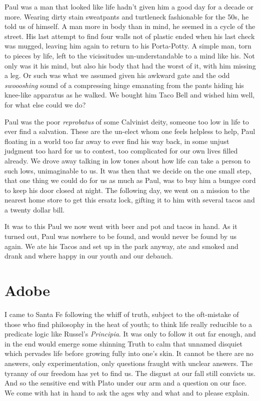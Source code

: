 \documentclass[ebook, 10pt, openright, onecolumn]{memoir}
\begin{document}
Paul was a man that looked like life hadn't given him a good day for a decade or
more.  Wearing dirty stain sweatpants and turtleneck fashionable for the 50s, he
told us of himself.  A man more in body than in mind, he seemed in a cycle of
the street.  His last attempt to find four walls not of plastic ended when his
last check was mugged, leaving him again to return to his Porta-Potty.  A simple
man, torn to pieces by life, left to the vicissitudes un-understandable to a
mind like his. Not only was it his mind, but also his body that had the worst of
it, with him missing a leg. Or such was what we assumed given his awkward gate
and the odd \textit{swoooshing} sound of a compressing hinge emanating from the
pants hiding his knee-like apparatus as he walked.  We bought him Taco Bell and
wished him well, for what else could we do?

Paul was the poor \textit{reprobatus} of some Calvinist deity, someone too low
in life to ever find a salvation.  These are the un-elect whom one feels helpless to
help, Paul floating in a world too far away to ever find his way back, in some unjust
judgment too hard for us to contest, too complicated for our own lives filled
already.  We drove away talking in low tones about how life can take a person to
such lows, unimaginable to us.  It was then that we decide on the one small
step, that one thing we could do for us as much as Paul, was to buy him a bungee
cord to keep his door closed at night.  The following day, we went on a mission
to the nearest home store to get this ersatz lock, gifting it to him with
several tacos and a twenty dollar bill.

It was to this Paul we now went with beer and pot and tacos in hand.  As it
turned out, Paul was nowhere to be found, and would never be found by us again.
We ate his Tacos and set up in the park anyway, ate and smoked and drank and
where happy in our youth and our debauch.

\chapter{Adobe}
\label{cha:adobe}

I came to Santa Fe following the whiff of truth, subject to the oft-mistake of
those who find philosophy in the heat of youth; to think life really reducible
to a predicate logic like Russel's \textit{Principia}. It was only to follow it
out far enough, and in the end would emerge some shinning Truth to calm that
unnamed disquiet which pervades life before growing fully into one's skin.  It
cannot be there are no answers, only experimentation, only questions fraught
with unclear answers.  The tyranny of our freedom has yet to find us.  The
disgust at our fall still convicts us.  And so the sensitive end with Plato
under our arm and a question on our face.  We come with hat in hand to ask the
ages why and what and to please explain.
\end{document}
